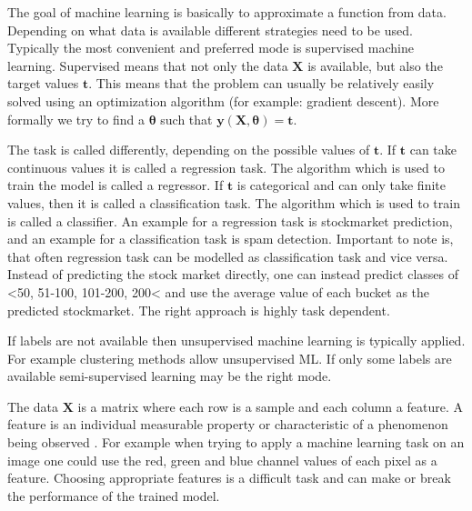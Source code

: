 \documentclass[draft,final,oneside]{vutinfth} %
\begin{document}

The goal of machine learning is basically to approximate a function from data. Depending on what data is available different strategies need to be used. Typically the most convenient and preferred mode is supervised machine learning. Supervised means that not only the data $\boldsymbol{X}$ is available, but also the target values $\boldsymbol{t}$. This means that the problem can usually be relatively easily solved using an optimization algorithm (for example: gradient descent). More formally we try to find a $\boldsymbol{\theta}$ such that $\boldsymbol{y}(\boldsymbol{X}, \boldsymbol{\theta}) = \boldsymbol{t}$.

The task is called differently, depending on the possible values of $\boldsymbol{t}$. If $\boldsymbol{t}$ can take continuous values it is called a regression task. The algorithm which is used to train the model is called a regressor. If $\boldsymbol{t}$ is categorical and can only take finite values, then it is called a classification task. The algorithm which is used to train is called a classifier. An example for a regression task is stockmarket prediction, and an example for a classification task is spam detection. Important to note is, that often regression task can be modelled as classification task and vice versa. Instead of predicting the stock market directly, one can instead predict classes of <50, 51-100, 101-200, 200< and use the average value of each bucket as the predicted stockmarket. The right approach is highly task dependent.

If labels are not available then unsupervised machine learning is typically applied. For example clustering methods allow unsupervised ML. If only some labels are available semi-supervised learning may be the right mode.

The data $\boldsymbol{X}$ is a matrix where each row is a sample and each column a feature. A feature is an individual measurable property or characteristic of a phenomenon being observed \cite{bishop}. For example when trying to apply a machine learning task on an image one could use the red, green and blue channel values of each pixel as a feature. Choosing appropriate features is a difficult task and can make or break the performance of the trained model.
\end{document}
